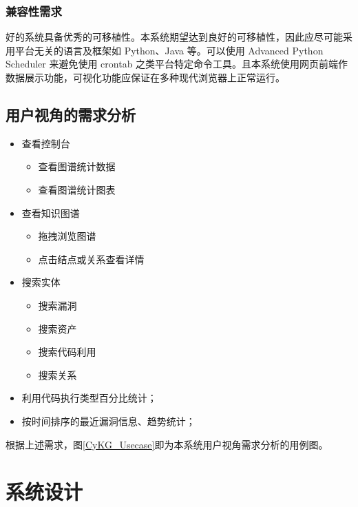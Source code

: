 \documentclass[a4paper,AutoFakeBold,oneside,12pt]{book}
\begin{document}
\subsection{兼容性需求}

好的系统具备优秀的可移植性。本系统期望达到良好的可移植性，因此应尽可能采用平台无关的语言及框架如 Python、Java 等。可以使用 Advanced Python Scheduler 来避免使用 crontab 之类平台特定命令工具。且本系统使用网页前端作数据展示功能，可视化功能应保证在多种现代浏览器上正常运行。

\section{用户视角的需求分析}

\begin{itemize}
	\item 查看控制台
	      \begin{itemize}
		      \item 查看图谱统计数据
		      \item 查看图谱统计图表
	      \end{itemize}
	\item 查看知识图谱
	      \begin{itemize}
		      \item 拖拽浏览图谱
		      \item 点击结点或关系查看详情
	      \end{itemize}
	\item 搜索实体
	      \begin{itemize}
		      \item 搜索漏洞
		      \item 搜索资产
		      \item 搜索代码利用
		      \item 搜索关系
	      \end{itemize}
	\item 利用代码执行类型百分比统计；
	\item 按时间排序的最近漏洞信息、趋势统计；
\end{itemize}

根据上述需求，图\ref{CyKG_Usecase}即为本系统用户视角需求分析的用例图。


\chapter{系统设计}
\end{document}
